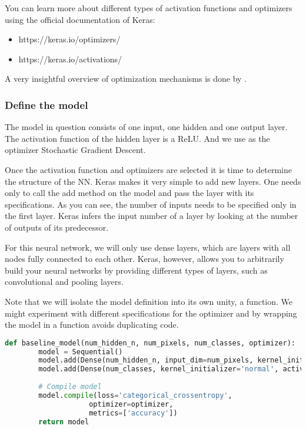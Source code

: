 You can learn more about different types of activation functions and optimizers using the official documentation of Keras:

\begin{itemize}
    \item https://keras.io/optimizers/
    \item https://keras.io/activations/
\end{itemize}

A very insightful overview of optimization mechanisms is done by \cite{ruder2016overview}.

\subsubsection{Define the model}

The model in question consists of one input, one hidden and one output layer. The activation function of the hidden layer is a ReLU. And we use as the optimizer Stochastic Gradient Descent. 

Once the activation function and optimizers are selected it is time to determine the structure of the NN. Keras makes it very simple to add new layers. One needs only to call the add method on the model and pass the layer with its specifications. As you can see, the number of inputs needs to be specified only in the first layer. Keras infers the input number of a layer by looking at the number of outputs of its predecessor.

For this neural network, we will only use dense layers, which are layers with all nodes fully connected to each other. Keras, however, allows you to arbitrarily build your neural networks by providing different types of layers, such as convolutional and pooling layers.

Note that we will isolate the model definition into its own unity, a function. We might experiment with different specifications for the optimizer and by wrapping the model in a function avoids duplicating code.

\begin{lstlisting}[language=Python]
    def baseline_model(num_hidden_n, num_pixels, num_classes, optimizer):
        model = Sequential()
        model.add(Dense(num_hidden_n, input_dim=num_pixels, kernel_initializer='normal', activation='relu'))
        model.add(Dense(num_classes, kernel_initializer='normal', activation='softmax'))
        
        # Compile model
        model.compile(loss='categorical_crossentropy', 
                    optimizer=optimizer,
                    metrics=['accuracy'])
        return model
\end{lstlisting}

